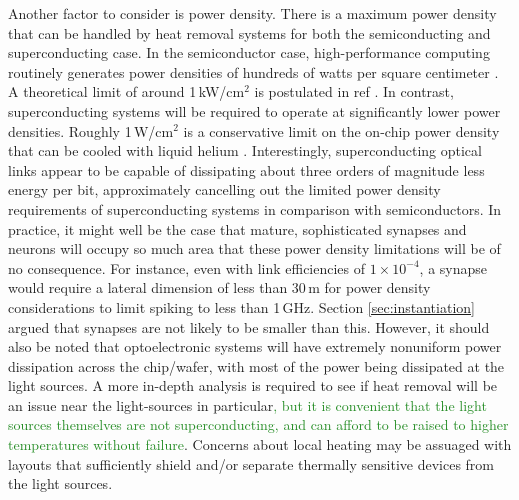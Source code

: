 \documentclass[twocolumn]{article}
\begin{document}
Another factor to consider is power density. There is a maximum power density that can be handled by heat removal systems for both the semiconducting and superconducting case. In the semiconductor case, high-performance computing routinely generates power densities of hundreds of watts per square centimeter \cite{tolpygo2016superconductor}. A theoretical limit of around 1\,kW/cm$^2$ is postulated in ref \cite{zhirnov2003limits}. In contrast, superconducting systems will be required to operate at significantly lower power densities. Roughly 1\,W/cm$^2$ is a conservative limit on the on-chip power density that can be cooled with liquid helium \cite{tolpygo2016superconductor}. Interestingly, superconducting optical links appear to be capable of dissipating about three orders of magnitude less energy per bit, approximately cancelling out the limited power density requirements of superconducting systems in comparison with semiconductors. In practice, it might well be the case that mature, sophisticated synapses and neurons will occupy so much area that these power density limitations will be of no consequence. For instance, even with link efficiencies of $1 \times 10^{-4}$, a synapse would require a lateral dimension of less than 30\,\textmu m for power density considerations to limit spiking to less than 1\,GHz. Section \ref{sec:instantiation} argued that synapses are not likely to be smaller than this. However, it should also be noted that optoelectronic systems will have extremely nonuniform power dissipation across the chip/wafer, with most of the power being dissipated at the light sources. A more in-depth analysis is required to see if heat removal will be an issue near the light-sources in particular\textcolor{ForestGreen}{, but it is convenient that the light sources themselves are not superconducting, and can afford to be raised to higher temperatures without failure}. Concerns about local heating may be assuaged with layouts that sufficiently shield and/or separate thermally sensitive devices from the light sources.
\end{document}
